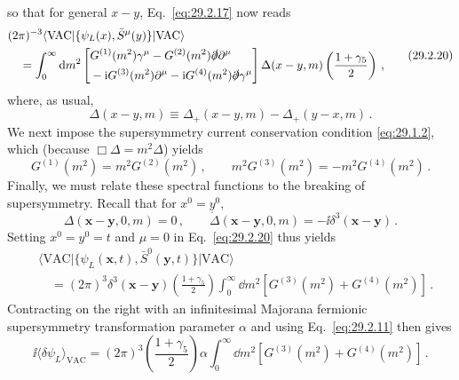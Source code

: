 so that for general \(x-y\), Eq.~\eqref{eq:29.2.17} now reads
\begin{equation}
  \begin{aligned}
  &(2\pi)^{-3}
  \langle\mathrm{VAC}\lvert
    \{\psi_L(x),\bar S^\mu(y)\}
  \rvert\mathrm{VAC}\rangle
  \\
  &\quad=
  \int_0^\infty \mathop{}\!\mathrm{d} m^2
  \left[
  \begin{aligned}
    &G^{(1)}(m^2)\gamma^\mu
    -G^{(2)}(m^2)\slashed{\partial}\partial^\mu
    \\
    &-\mathrm{i} G^{(3)}(m^2)\partial^\mu
    -\mathrm{i} G^{(4)}(m^2)\slashed{\partial}\gamma^\mu
  \end{aligned}
  \right]
  \Delta(x-y,m)\left(\frac{1+\gamma_5}{2}\right)\,,
  \end{aligned}
  \tag{29.2.20}\label{eq:29.2.20}
\end{equation}
where, as usual,
\begin{equation}
  \Delta(x-y,m)
  \equiv
  \Delta_+(x-y,m)-\Delta_+(y-x,m)\,.
  \tag{29.2.21}\label{eq:29.2.21}
\end{equation}
We next impose the supersymmetry current conservation condition
\eqref{eq:29.1.2}, which (because \(\Box\Delta=m^2\Delta\)) yields
\begin{equation}
  G^{(1)}(m^2)=m^2G^{(2)}(m^2)\,,
  \qquad
  m^2G^{(3)}(m^2)=-m^2G^{(4)}(m^2)\,.
  \tag{29.2.22}\label{eq:29.2.22}
\end{equation}
Finally, we must relate these spectral functions to the breaking of
supersymmetry. Recall that for \(x^0=y^0\),
\[
  \Delta(\mathbf x-\mathbf y,0,m)=0\,,
  \qquad
  \dot\Delta(\mathbf x-\mathbf y,0,m)
  =-\ii\delta^3(\mathbf x-\mathbf y)\,.
\]
Setting \(x^0=y^0=t\) and \(\mu=0\) in Eq.~\eqref{eq:29.2.20} thus yields
\begin{equation}
  \begin{aligned}
  &\langle\mathrm{VAC}\lvert
    \{\psi_L(\mathbf x,t),\bar S^0(\mathbf y,t)\}
  \rvert\mathrm{VAC}\rangle
  \\
  &\quad=
  (2\pi)^3\delta^3(\mathbf x-\mathbf y)
  \left(\frac{1+\gamma_5}{2}\right)
  \int_0^\infty \dd m^2
  \left[G^{(3)}(m^2)+G^{(4)}(m^2)\right]\,.
  \end{aligned}
  \tag{29.2.23}\label{eq:29.2.23}
\end{equation}
Contracting on the right with an infinitesimal Majorana fermionic
supersymmetry transformation parameter \(\alpha\) and using
Eq.~\eqref{eq:29.2.11} then gives
\begin{equation}
  \ii\langle\delta\psi_L\rangle_{\mathrm{VAC}}
  =(2\pi)^3\left(\frac{1+\gamma_5}{2}\right)\alpha
  \int_0^\infty \dd m^2
  \left[G^{(3)}(m^2)+G^{(4)}(m^2)\right]\,.
  \tag{29.2.24}\label{eq:29.2.24}
\end{equation}
